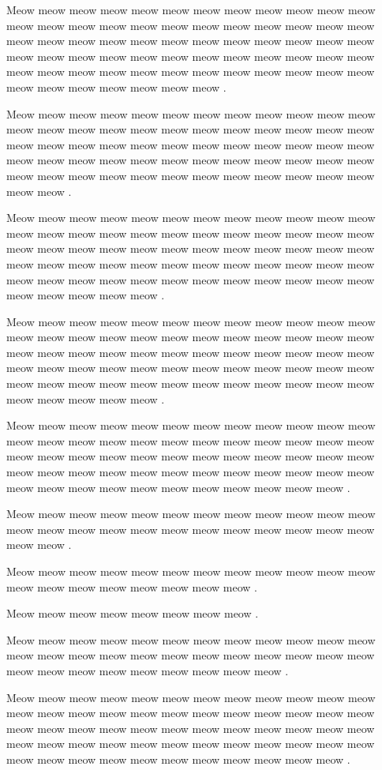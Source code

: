 \documentclass[12pt, a5paper, openany]{book}
\begin{document}
Meow meow meow meow meow meow meow meow meow meow meow meow meow meow meow meow meow meow meow meow meow meow meow meow meow meow meow meow meow meow meow meow meow meow meow meow meow meow meow meow meow meow meow meow meow meow meow meow meow meow meow meow meow meow meow meow meow meow meow meow meow meow meow meow meow meow meow .

Meow meow meow meow meow meow meow meow meow meow meow meow meow meow meow meow meow meow meow meow meow meow meow meow meow meow meow meow meow meow meow meow meow meow meow meow meow meow meow meow meow meow meow meow meow meow meow meow meow meow meow meow meow meow meow meow meow meow meow meow meow meow .

Meow meow meow meow meow meow meow meow meow meow meow meow meow meow meow meow meow meow meow meow meow meow meow meow meow meow meow meow meow meow meow meow meow meow meow meow meow meow meow meow meow meow meow meow meow meow meow meow meow meow meow meow meow meow meow meow meow meow meow meow meow meow meow meow meow .

Meow meow meow meow meow meow meow meow meow meow meow meow meow meow meow meow meow meow meow meow meow meow meow meow meow meow meow meow meow meow meow meow meow meow meow meow meow meow meow meow meow meow meow meow meow meow meow meow meow meow meow meow meow meow meow meow meow meow meow meow meow meow meow meow meow .

Meow meow meow meow meow meow meow meow meow meow meow meow meow meow meow meow meow meow meow meow meow meow meow meow meow meow meow meow meow meow meow meow meow meow meow meow meow meow meow meow meow meow meow meow meow meow meow meow meow meow meow meow meow meow meow meow meow meow meow .

Meow meow meow meow meow meow meow meow meow meow meow meow meow meow meow meow meow meow meow meow meow meow meow meow meow meow .

Meow meow meow meow meow meow meow meow meow meow meow meow meow meow meow meow meow meow meow meow .

Meow meow meow meow meow meow meow meow .

Meow meow meow meow meow meow meow meow meow meow meow meow meow meow meow meow meow meow meow meow meow meow meow meow meow meow meow meow meow meow meow meow meow .

Meow meow meow meow meow meow meow meow meow meow meow meow meow meow meow meow meow meow meow meow meow meow meow meow meow meow meow meow meow meow meow meow meow meow meow meow meow meow meow meow meow meow meow meow meow meow meow meow meow meow meow meow meow meow meow meow meow meow meow .
\end{document}
